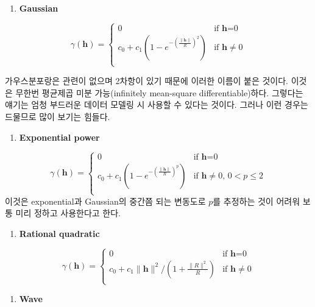 \documentclass[b5paper,]{scrbook}
\providecommand{\tightlist}{%
  \setlength{\itemsep}{0pt}\setlength{\parskip}{0pt}}
\theoremstyle{plain}
\theoremstyle{definition}
\numberwithin{equation}{section}
\begin{document}
\begin{enumerate}
\def\labelenumi{\arabic{enumi}.}
\setcounter{enumi}{3}
\tightlist
\item
  \textbf{Gaussian}
\end{enumerate}

\[
\gamma(\mathbf{h})= \left\{ \begin{array}{ll}
0 & \textrm{if $\mathbf{h}$=0}\\
c_{0}+c_{1}(1-e^{-(\frac{\|\mathbf{h}\|}{R})^{2}}) & \textrm{if $\mathbf{h}\neq 0$}\\
\end{array} \right.
\]

가우스분포랑은 관련이 없으며 2차항이 있기 때문에 이러한 이름이 붙은
것이다. 이것은 무한번 평균제곱 미분 가능(infinitely mean-square
differentiable)하다. 그렇다는 얘기는 엄청 부드러운 데이터 모델링 시
사용할 수 있다는 것이다. 그러나 이런 경우는 드물므로 많이 보기는 힘들다.

\begin{enumerate}
\def\labelenumi{\arabic{enumi}.}
\setcounter{enumi}{4}
\tightlist
\item
  \textbf{Exponential power}
\end{enumerate}

\[
\gamma(\mathbf{h})= \left\{ \begin{array}{ll}
0 & \textrm{if $\mathbf{h}$=0}\\
c_{0}+c_{1}(1-e^{-(\frac{\|\mathbf{h}\|}{R})^{p}}) & \textrm{if $\mathbf{h}\neq 0$, $0 < p \leq 2$}\\
\end{array} \right.
\] 이것은 exponential과 Gaussian의 중간쯤 되는 변동도로 \(p\)를 추정하는
것이 어려워 보통 미리 정하고 사용한다고 한다.

\begin{enumerate}
\def\labelenumi{\arabic{enumi}.}
\setcounter{enumi}{5}
\tightlist
\item
  \textbf{Rational quadratic}
\end{enumerate}

\[
\gamma(\mathbf{h})= \left\{ \begin{array}{ll}
0 & \textrm{if $\mathbf{h}$=0}\\
c_{0}+c_{1}\| \mathbf{h}\|^{2}/(1+\frac{\|R\|^{2}}{R}) & \textrm{if $\mathbf{h}\neq 0$}\\
\end{array} \right.
\]

\begin{enumerate}
\def\labelenumi{\arabic{enumi}.}
\setcounter{enumi}{6}
\tightlist
\item
  \textbf{Wave}
\end{enumerate}
\end{document}
